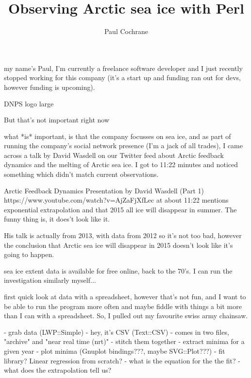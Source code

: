 \documentclass{beamer}
\title{Observing Arctic sea ice with Perl}
\author{Paul Cochrane}
\begin{document}
\begin{frame}
    \titlepage
\end{frame}

my name's Paul, I'm currently a freelance software developer and I just
recently stopped working for this company (it's a start up and funding ran
out for devs, however funding is upcoming).

\begin{frame}
    DNPS logo large
\end{frame}

\begin{frame}
    But that's not important right now
\end{frame}

what *is* important, is that the company focusses on sea ice, and as part of
running the company's social network presence (I'm a jack of all trades), I
came across a talk by David Wasdell on our Twitter feed about Arctic
feedback dynamics and the melting of Arctic sea ice.  I got to 11:22 minutes
and noticed something which didn't match current observations.

\begin{frame}
Arctic Feedback Dynamics Presentation by David Wasdell (Part 1)
https://www.youtube.com/watch?v=AjZaFjXfLec
at about 11:22 mentions exponential extrapolation and that 2015 all ice will
disappear in summer.  The funny thing is, it does't look like it.

His talk is actually from 2013, with data from 2012 so it's not too bad,
however the conclusion that Arctic sea ice will disappear in 2015 doesn't
look like it's going to happen.

sea ice extent data is available for free online, back to the 70's.  I can
run the investigation similarly myself...
\end{frame}

first quick look at data with a spreadsheet, however that's not fun, and I
want to be able to run the program more often and maybe fiddle with things a
bit more than I can with a spreadsheet.  So, I pulled out my favourite swiss
army chainsaw.

- grab data (LWP::Simple)
- hey, it's CSV (Text::CSV)
- comes in two files, "archive" and "near real time (nrt)"
- stitch them together
- extract minima for a given year
- plot minima (Gnuplot bindings???, maybe SVG::Plot???)
- fit library?  Linear regression from scratch?
- what is the equation for the the fit?
- what does the extrapolation tell us?
\end{document}
